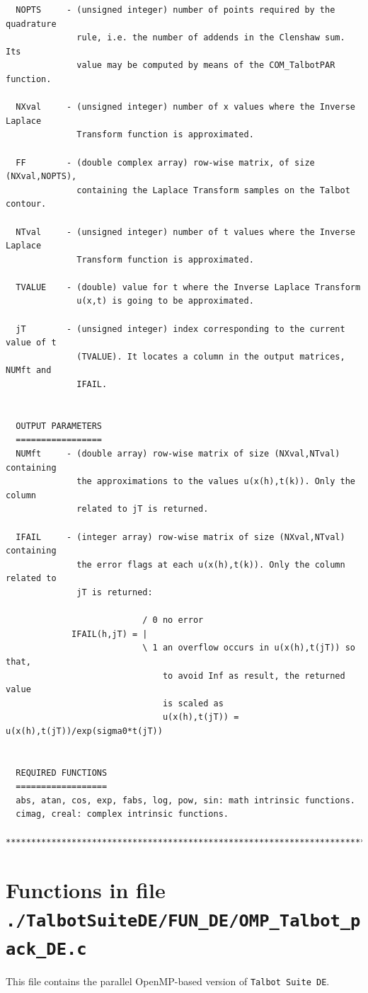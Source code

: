 \documentclass[a4paper,10pt]{report}%
\begin{document}
\begin{lstlisting}
  NOPTS     - (unsigned integer) number of points required by the quadrature
              rule, i.e. the number of addends in the Clenshaw sum. Its
              value may be computed by means of the COM_TalbotPAR function.

  NXval     - (unsigned integer) number of x values where the Inverse Laplace
              Transform function is approximated.

  FF        - (double complex array) row-wise matrix, of size (NXval,NOPTS),
              containing the Laplace Transform samples on the Talbot contour.

  NTval     - (unsigned integer) number of t values where the Inverse Laplace
              Transform function is approximated.

  TVALUE    - (double) value for t where the Inverse Laplace Transform
              u(x,t) is going to be approximated.

  jT        - (unsigned integer) index corresponding to the current value of t
              (TVALUE). It locates a column in the output matrices, NUMft and
              IFAIL.


  OUTPUT PARAMETERS
  =================
  NUMft     - (double array) row-wise matrix of size (NXval,NTval) containing
              the approximations to the values u(x(h),t(k)). Only the column
              related to jT is returned.

  IFAIL     - (integer array) row-wise matrix of size (NXval,NTval) containing
              the error flags at each u(x(h),t(k)). Only the column related to
              jT is returned:

                           / 0 no error
             IFAIL(h,jT) = |
                           \ 1 an overflow occurs in u(x(h),t(jT)) so that,
                               to avoid Inf as result, the returned value
                               is scaled as
                               u(x(h),t(jT)) = u(x(h),t(jT))/exp(sigma0*t(jT))


  REQUIRED FUNCTIONS
  ==================
  abs, atan, cos, exp, fabs, log, pow, sin: math intrinsic functions.
  cimag, creal: complex intrinsic functions.

*****************************************************************************\
\end{lstlisting}



\section{Functions in file {\large\tt ./TalbotSuiteDE/FUN\_DE/OMP\_Talbot\_pack\_DE.c}}
This file contains the parallel OpenMP-based version of {\tt Talbot Suite DE}.
\end{document}
